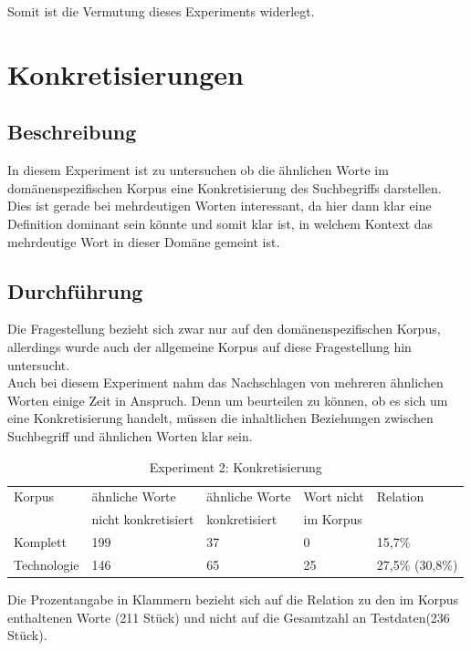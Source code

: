 \documentclass[12pt,a4paper]{report}
\begin{document}
		Somit ist die Vermutung dieses Experiments widerlegt.
		
		
	\newpage
	\section{Konkretisierungen}
		\subsection{Beschreibung}
		In diesem Experiment ist zu untersuchen ob die ähnlichen Worte im domänenspezifischen Korpus eine Konkretisierung des Suchbegriffs darstellen.\\
		Dies ist gerade bei mehrdeutigen Worten interessant, da hier dann klar eine Definition dominant sein könnte und somit klar ist, in welchem Kontext das mehrdeutige Wort in dieser Domäne gemeint ist.\\
		\subsection{Durchführung}
		Die Fragestellung bezieht sich zwar nur auf den domänenspezifischen Korpus, allerdings wurde auch der allgemeine Korpus auf diese Fragestellung hin untersucht.\\
		Auch bei diesem Experiment nahm das Nachschlagen von mehreren ähnlichen Worten einige Zeit in Anspruch. Denn um beurteilen zu können, ob es sich um eine Konkretisierung handelt, müssen die inhaltlichen Beziehungen zwischen Suchbegriff und ähnlichen Worten klar sein. \\
		
		
\begin{table}[h]
\caption{Experiment 2: Konkretisierung}
\begin{center}
\begin{tabular}{|l||l|l|l|l|}
\hline
Korpus & ähnliche Worte & ähnliche Worte  & Wort nicht  & Relation\\
 & nicht konkretisiert & konkretisiert & im Korpus & \\

\hline
 Komplett & 199 & 37 & 0 & 15,7\% \\
 \hline
 Technologie & 146 & 65 & 25 & 27,5\% (30,8\%)\\
 \hline
 
\end{tabular}
\end{center}
\end{table}
		Die Prozentangabe in Klammern bezieht sich auf die Relation zu den im Korpus enthaltenen Worte (211 Stück) und nicht auf die Gesamtzahl an Testdaten(236 Stück).\\
		
\end{document}
